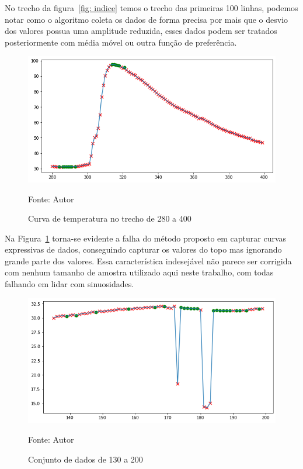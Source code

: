 No trecho da figura~\ref{fig: indice} temos o trecho das primeiras 100 linhas, podemos notar como o algoritmo coleta os dados de forma precisa por mais que o desvio dos valores possua uma amplitude reduzida, esses dados podem ser tratados posteriormente com média móvel ou outra função de preferência.


\begin{figure}[H]
	\centering
	\includegraphics[width=15cm]{imagens/sensores/indice2.png}
	\caption{Curva de temperatura no trecho de 280 a 400}
	Fonte: Autor
	\label{fig: indice2}
\end{figure}

Na Figura~\ref{fig: indice2} torna-se evidente a falha do método proposto em capturar curvas expressivas de dados, conseguindo capturar os valores do topo mas ignorando grande parte dos valores. Essa característica indesejável não parece ser corrigida com nenhum tamanho de amostra utilizado aqui neste trabalho, com todas falhando em lidar com sinuosidades.

\begin{figure}[H]
	\centering
	\includegraphics[width=15cm]{imagens/sensores/indice4.png}
	\caption{Conjunto de dados de 130 a 200}
	Fonte: Autor
	\label{fig: indice4}
\end{figure}


